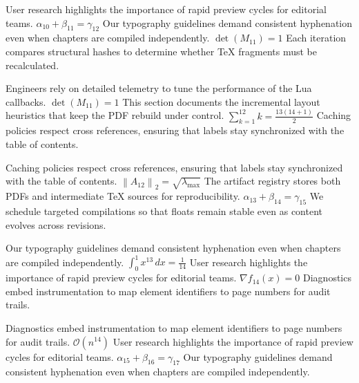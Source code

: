 \documentclass[12pt,a4paper,twocolumn]{article}
\newcommand{\paraid}[1]{\par\noindent\hypertarget{#1}{\ignorespaces}}
\begin{document}
\paraid{sec7-p3}User research highlights the importance of rapid preview cycles for editorial teams. $\alpha_{10} + \beta_{11} = \gamma_{12}$ Our typography guidelines demand consistent hyphenation even when chapters are compiled independently. $\det(M_{11}) = 1$ Each iteration compares structural hashes to determine whether TeX fragments must be recalculated.
\par

\paraid{sec7-p4}Engineers rely on detailed telemetry to tune the performance of the Lua callbacks. $\det(M_{11}) = 1$ This section documents the incremental layout heuristics that keep the PDF rebuild under control. $\sum_{k=1}^{12} k = \frac{13(14+1)}{2}$ Caching policies respect cross references, ensuring that labels stay synchronized with the table of contents.
\par

\paraid{sec7-p5}Caching policies respect cross references, ensuring that labels stay synchronized with the table of contents. $\left\|A_{12}\right\|_{2} = \sqrt{\lambda_{\max}}$ The artifact registry stores both PDFs and intermediate TeX sources for reproducibility. $\alpha_{13} + \beta_{14} = \gamma_{15}$ We schedule targeted compilations so that floats remain stable even as content evolves across revisions.
\par

\paraid{sec7-p6}Our typography guidelines demand consistent hyphenation even when chapters are compiled independently. $\int_{0}^{1} x^{13} \, dx = \frac{1}{14}$ User research highlights the importance of rapid preview cycles for editorial teams. $\nabla f_{14}(x) = 0$ Diagnostics embed instrumentation to map element identifiers to page numbers for audit trails.
\par

\paraid{sec7-p7}Diagnostics embed instrumentation to map element identifiers to page numbers for audit trails. $\mathcal{O}(n^{14})$ User research highlights the importance of rapid preview cycles for editorial teams. $\alpha_{15} + \beta_{16} = \gamma_{17}$ Our typography guidelines demand consistent hyphenation even when chapters are compiled independently.
\par
\end{document}

